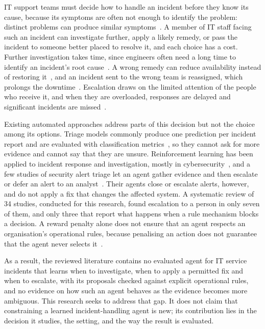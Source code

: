 IT support teams must decide how to handle an incident before they know its cause, because its symptoms are often not enough to identify the problem: distinct problems can produce similar symptoms~\cite{chen2020}. A member of IT staff facing such an incident can investigate further, apply a likely remedy, or pass the incident to someone better placed to resolve it, and each choice has a cost. Further investigation takes time, since engineers often need a long time to identify an incident's root cause~\cite{chen2020}. A wrong remedy can reduce availability instead of restoring it~\cite{alauthman2026}, and an incident sent to the wrong team is reassigned, which prolongs the downtime~\cite{chen2020}. Escalation draws on the limited attention of the people who receive it, and when they are overloaded, responses are delayed and significant incidents are missed~\cite{kovtun2026,turan2026}.

Existing automated approaches address parts of this decision but not the choice among its options. Triage models commonly produce one prediction per incident report and are evaluated with classification metrics~\cite{chen2020,remil2024}, so they cannot ask for more evidence and cannot say that they are unsure. Reinforcement learning has been applied to incident response and investigation, mostly in cybersecurity~\cite{dunsin2025,hammar2025,hammar2026belief}, and a few studies of security alert triage let an agent gather evidence and then escalate or defer an alert to an analyst~\cite{sahin2026,kovtun2026}. Their agents close or escalate alerts, however, and do not apply a fix that changes the affected system. A systematic review of 34 studies, conducted for this research, found escalation to a person in only seven of them, and only three that report what happens when a rule mechanism blocks a decision. A reward penalty alone does not ensure that an agent respects an organisation's operational rules, because penalising an action does not guarantee that the agent never selects it~\cite{konighofer2025}.

As a result, the reviewed literature contains no evaluated agent for IT service incidents that learns when to investigate, when to apply a permitted fix and when to escalate, with its proposals checked against explicit operational rules, and no evidence on how such an agent behaves as the evidence becomes more ambiguous. This research seeks to address that gap. It does not claim that constraining a learned incident-handling agent is new; its contribution lies in the decision it studies, the setting, and the way the result is evaluated.

